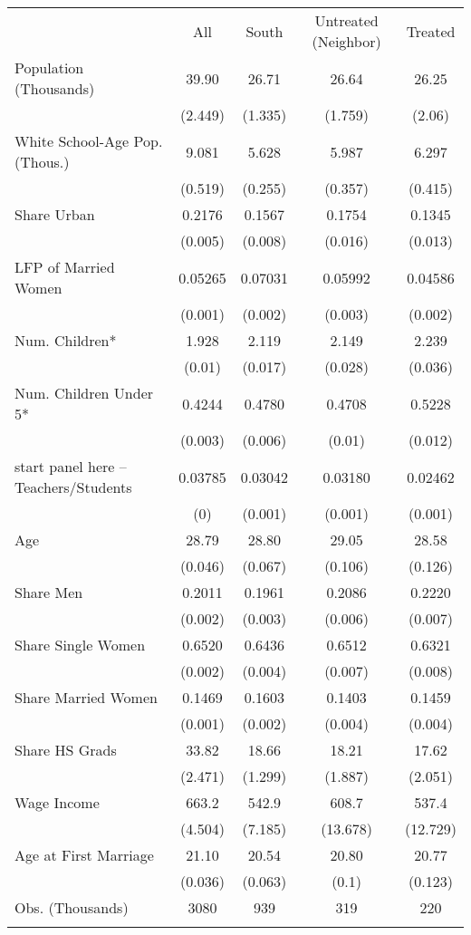 \begin{tabular}{lcccc}
\hhline{=====}
&
All & South & Untreated (Neighbor) & Treated\\
Population (Thousands) & 39.90 & 26.71 & 26.64 & 26.25\\
&
(2.449) & (1.335) & (1.759) & (2.06)\\
White School-Age Pop. (Thous.) & 9.081 & 5.628 & 5.987 & 6.297\\
&
(0.519) & (0.255) & (0.357) & (0.415)\\
Share Urban & 0.2176 & 0.1567 & 0.1754 & 0.1345\\
&
(0.005) & (0.008) & (0.016) & (0.013)\\
LFP of Married Women & 0.05265 & 0.07031 & 0.05992 & 0.04586\\
&
(0.001) & (0.002) & (0.003) & (0.002)\\
Num. Children* & 1.928 & 2.119 & 2.149 & 2.239\\
&
(0.01) & (0.017) & (0.028) & (0.036)\\
Num. Children Under 5* & 0.4244 & 0.4780 & 0.4708 & 0.5228\\
&
(0.003) & (0.006) & (0.01) & (0.012)\\
start panel here -- Teachers/Students & 0.03785 & 0.03042 & 0.03180 & 0.02462\\
&
(0) & (0.001) & (0.001) & (0.001)\\
Age & 28.79 & 28.80 & 29.05 & 28.58\\
&
(0.046) & (0.067) & (0.106) & (0.126)\\
Share Men & 0.2011 & 0.1961 & 0.2086 & 0.2220\\
&
(0.002) & (0.003) & (0.006) & (0.007)\\
Share Single Women & 0.6520 & 0.6436 & 0.6512 & 0.6321\\
&
(0.002) & (0.004) & (0.007) & (0.008)\\
Share Married Women & 0.1469 & 0.1603 & 0.1403 & 0.1459\\
&
(0.001) & (0.002) & (0.004) & (0.004)\\
Share HS Grads & 33.82 & 18.66 & 18.21 & 17.62\\
&
(2.471) & (1.299) & (1.887) & (2.051)\\
Wage Income & 663.2 & 542.9 & 608.7 & 537.4\\
&
(4.504) & (7.185) & (13.678) & (12.729)\\
Age at First Marriage & 21.10 & 20.54 & 20.80 & 20.77\\
&
(0.036) & (0.063) & (0.1) & (0.123)\\
Obs. (Thousands)
&
3080 & 939 & 319 & 220\\
\hhline{-----}
\end{tabular}
